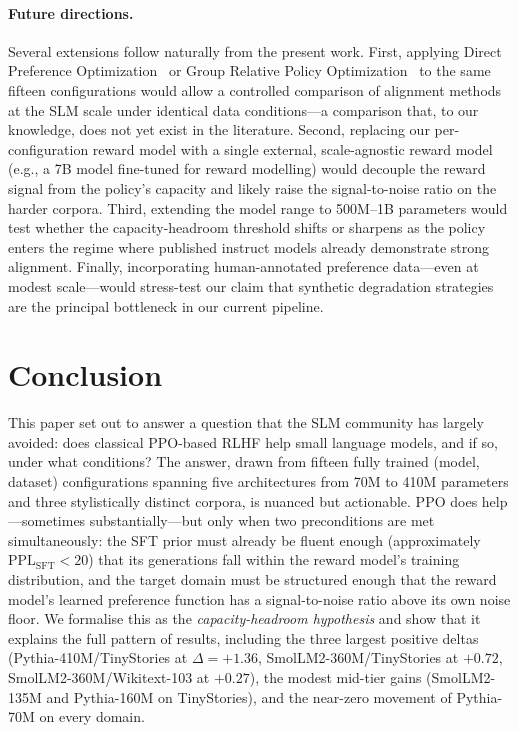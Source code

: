 \documentclass[10pt,twocolumn,letterpaper]{article}
\begin{document}
\paragraph{Future directions.}
Several extensions follow naturally from the present work. First, applying Direct Preference Optimization~\cite{rafailov2023direct} or Group Relative Policy Optimization~\cite{shao2024deepseekmath} to the same fifteen configurations would allow a controlled comparison of alignment methods at the SLM scale under identical data conditions---a comparison that, to our knowledge, does not yet exist in the literature. Second, replacing our per-configuration reward model with a single external, scale-agnostic reward model (e.g., a 7B model fine-tuned for reward modelling) would decouple the reward signal from the policy's capacity and likely raise the signal-to-noise ratio on the harder corpora. Third, extending the model range to 500M--1B parameters would test whether the capacity-headroom threshold shifts or sharpens as the policy enters the regime where published instruct models already demonstrate strong alignment. Finally, incorporating human-annotated preference data---even at modest scale---would stress-test our claim that synthetic degradation strategies are the principal bottleneck in our current pipeline.

\section{Conclusion}
\label{sec:conclusion}

This paper set out to answer a question that the SLM community has largely avoided: does classical PPO-based RLHF help small language models, and if so, under what conditions? The answer, drawn from fifteen fully trained (model, dataset) configurations spanning five architectures from 70M to 410M parameters and three stylistically distinct corpora, is nuanced but actionable. PPO does help---sometimes substantially---but only when two preconditions are met simultaneously: the SFT prior must already be fluent enough (approximately $\text{PPL}_{\text{SFT}}<20$) that its generations fall within the reward model's training distribution, and the target domain must be structured enough that the reward model's learned preference function has a signal-to-noise ratio above its own noise floor. We formalise this as the \emph{capacity-headroom hypothesis} and show that it explains the full pattern of results, including the three largest positive deltas (Pythia-410M/TinyStories at $\Delta=+1.36$, SmolLM2-360M/TinyStories at $+0.72$, SmolLM2-360M/Wikitext-103 at $+0.27$), the modest mid-tier gains (SmolLM2-135M and Pythia-160M on TinyStories), and the near-zero movement of Pythia-70M on every domain.
\end{document}
